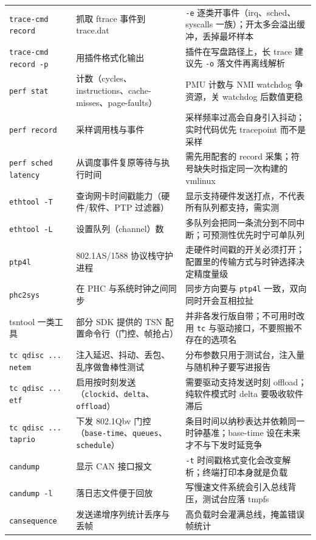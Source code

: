 \documentclass[12pt,a4paper,fontset=fandol]{ctexbook}
\newcommand{\Tp}[1]{\texttt{#1}}
\begin{document}
\begin{longtable}{>{\raggedright\arraybackslash\footnotesize}p{} >{\raggedright\arraybackslash\footnotesize}p{} >{\raggedright\arraybackslash\footnotesize}p{}}
\Tp{trace-cmd record} & 抓取 ftrace 事件到 trace.dat & \Tp{-e} 逐类开事件（irq、sched、syscalls 一族）；开太多会溢出缓冲，丢掉最坏样本 \\
\Tp{trace-cmd record -p} & 用插件格式化输出 & 插件在写盘路径上，长 trace 建议先 \Tp{-o} 落文件再离线解析 \\
\Tp{perf stat} & 计数（cycles、instructions、cache-misses、page-faults） & PMU 计数与 NMI watchdog 争资源，关 watchdog 后数值更稳 \\
\Tp{perf record} & 采样调用栈与事件 & 采样频率过高会自身引入抖动；实时代码优先 tracepoint 而不是采样 \\
\Tp{perf sched latency} & 从调度事件复原等待与执行时间 & 需先用配套的 record 采集；符号缺失时指定同一次构建的 vmlinux \\
\Tp{ethtool -T} & 查询网卡时间戳能力（硬件/软件、PTP 过滤器） & 显示支持硬件发送打点，不代表所有队列都支持，需实测 \\
\Tp{ethtool -L} & 设置队列（channel）数 & 多队列会把同一条流分到不同中断；可预测性优先时宁可单队列 \\
\Tp{ptp4l} & 802.1AS/1588 协议栈守护进程 & 走硬件时间戳的开关必须打开；配置里的传输方式与时钟选择决定精度量级 \\
\Tp{phc2sys} & 在 PHC 与系统时钟之间同步 & 同步方向要与 \Tp{ptp4l} 一致，双向同时开会互相拉扯 \\
tsntool 一类工具 & 部分 SDK 提供的 TSN 配置命令行（门控、帧抢占） & 并非各发行版自带；不可用时改用 \Tp{tc} 与驱动接口，不要照搬不存在的选项名 \\
\Tp{tc qdisc ... netem} & 注入延迟、抖动、丢包、乱序做鲁棒性测试 & 分布参数只用于测试台，注入量与随机种子要写进报告 \\
\Tp{tc qdisc ... etf} & 启用按时刻发送（\Tp{clockid}、\Tp{delta}、\Tp{offload}） & 需要驱动支持发送时刻 offload；纯软件模式时 delta 要吸收软件滞后 \\
\Tp{tc qdisc ... taprio} & 下发 802.1Qbv 门控（\Tp{base-time}、\Tp{queues}、\Tp{schedule}） & 条目时间以纳秒表达并依赖同一时钟基准；base-time 设在未来才不与下发时延竞争 \\
\Tp{candump} & 显示 CAN 接口报文 & \Tp{-t} 时间戳格式变化会改变解析；终端打印本身就是负载 \\
\Tp{candump -l} & 落日志文件便于回放 & 写慢速文件系统会引入总线背压，测试台应落 tmpfs \\
\Tp{cansequence} & 发送递增序列统计丢序与丢帧 & 高负载时会灌满总线，掩盖错误帧统计 \\
\end{longtable}
\end{document}
